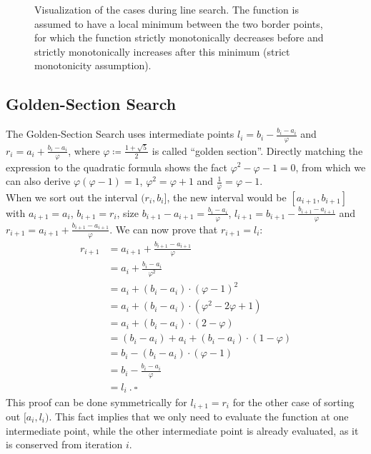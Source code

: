 \begin{figure}
{
\label{ex_ls5}}
\label{ex_linesearch}
\caption{Visualization of the cases during line search. The function is assumed to have a local minimum between the two border points, for which the function strictly monotonically decreases before and strictly monotonically increases after this minimum (strict monotonicity assumption).}
\end{figure}

\subsection{Golden-Section Search}
The Golden-Section Search uses intermediate points $l_i=b_i-\frac{b_i-a_i}{\varphi}$ and $r_i=a_i+\frac{b_i-a_i}{\varphi}$, where $\varphi\coloneqq\frac{1+\sqrt{5}}{2}$ is called ``golden section''. Directly matching the expression to the quadratic formula shows the fact $\varphi^2-\varphi-1=0$, from which we can also derive $\varphi(\varphi-1)=1$, $\varphi^2=\varphi+1$ and $\frac{1}{\varphi}=\varphi-1$.\\
When we sort out the interval $(r_i,b_i]$, the new interval would be $[a_{i+1},b_{i+1}]$ with $a_{i+1}=a_i$, $b_{i+1}=r_i$, size $b_{i+1}-a_{i+1}=\frac{b_i-a_i}{\varphi}$, $l_{i+1}=b_{i+1}-\frac{b_{i+1}-a_{i+1}}{\varphi}$ and $r_{i+1}=a_{i+1}+\frac{b_{i+1}-a_{i+1}}{\varphi}$. We can now prove that $r_{i+1}=l_i$:
\begin{align*}
r_{i+1}&=a_{i+1}+\frac{b_{i+1}-a_{i+1}}{\varphi}\\
&=a_i+\frac{b_i-a_i}{\varphi^2}\\
&=a_i+(b_i-a_i)\cdot (\varphi-1)^2\\
&=a_i+(b_i-a_i)\cdot (\varphi^2-2\varphi+1 )\\
&=a_i+(b_i-a_i)\cdot (2-\varphi)\\
&=(b_i-a_i)+a_i+(b_i-a_i)\cdot (1-\varphi)\\
&=b_i-(b_i-a_i)\cdot (\varphi-1)\\
&=b_i-\frac{b_i-a_i}{\varphi}\\
&=l_i~.~\square
\end{align*}
This proof can be done symmetrically for $l_{i+1}=r_i$ for the other case of sorting out $[a_i,l_i)$. This fact implies that we only need to evaluate the function at one intermediate point, while the other intermediate point is already evaluated, as it is conserved from iteration $i$.

